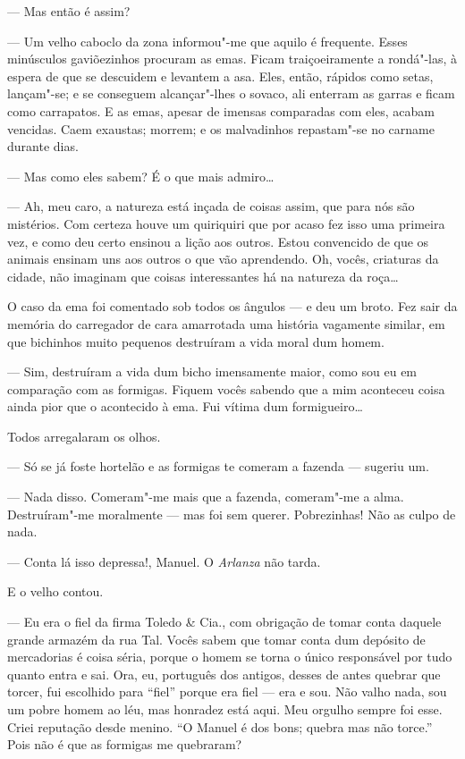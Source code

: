 --- Mas então é assim?

--- Um velho caboclo da zona informou"-me que aquilo é frequente. Esses
minúsculos gaviõezinhos procuram as emas. Ficam traiçoeiramente a
rondá"-las, à espera de que se descuidem e levantem a asa. Eles, então,
rápidos como setas, lançam"-se; e se conseguem alcançar"-lhes o sovaco,
ali enterram as garras e ficam como carrapatos. E as emas, apesar de
imensas comparadas com eles, acabam vencidas. Caem exaustas; morrem; e
os malvadinhos repastam"-se no carname durante dias.

--- Mas como eles sabem? É o que mais admiro\ldots{}

--- Ah, meu caro, a natureza está inçada de coisas assim, que para nós
são mistérios. Com certeza houve um quiriquiri que por acaso fez isso
uma primeira vez, e como deu certo ensinou a lição aos outros. Estou
convencido de que os animais ensinam uns aos outros o que vão
aprendendo. Oh, vocês, criaturas da cidade, não imaginam que coisas
interessantes há na natureza da roça\ldots{}

O caso da ema foi comentado sob todos os ângulos --- e deu um broto. Fez
sair da memória do carregador de cara amarrotada uma história vagamente
similar, em que bichinhos muito pequenos destruíram a vida moral dum
homem.

--- Sim, destruíram a vida dum bicho imensamente maior, como sou eu em
comparação com as formigas. Fiquem vocês sabendo que a mim aconteceu
coisa ainda pior que o acontecido à ema. Fui vítima dum formigueiro\ldots{}

Todos arregalaram os olhos.

--- Só se já foste hortelão e as formigas te comeram a fazenda ---
sugeriu um.

--- Nada disso. Comeram"-me mais que a fazenda, comeram"-me a alma.
Destruíram"-me moralmente --- mas foi sem querer. Pobrezinhas! Não as
culpo de nada.

--- Conta lá isso depressa!, Manuel. O \emph{Arlanza} não tarda.

E o velho contou.

--- Eu era o fiel da firma Toledo \& Cia., com obrigação de tomar conta
daquele grande armazém da rua Tal. Vocês sabem que tomar conta dum
depósito de mercadorias é coisa séria, porque o homem se torna o único
responsável por tudo quanto entra e sai. Ora, eu, português dos antigos,
desses de antes quebrar que torcer, fui escolhido para ``fiel'' porque
era fiel --- era e sou. Não valho nada, sou um pobre homem ao léu, mas
honradez está aqui. Meu orgulho sempre foi esse. Criei reputação desde
menino. ``O Manuel é dos bons; quebra mas não torce.'' Pois não é que as
formigas me quebraram?

